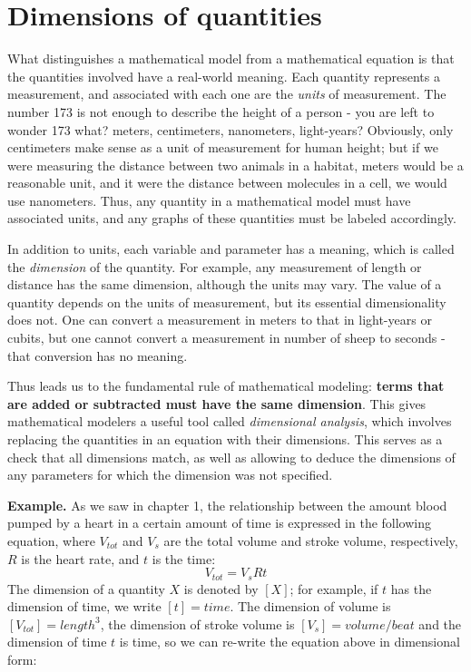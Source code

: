 \documentclass[
  letterpaper,
  DIV=11,
  numbers=noendperiod]{scrreprt}
\begin{document}
\hypertarget{sec:model2}{%
\section{Dimensions of quantities}\label{sec:model2}}

What distinguishes a mathematical model from a mathematical equation is
that the quantities involved have a real-world meaning. Each quantity
represents a measurement, and associated with each one are the
 \emph{units} of measurement. The number 173 is not enough
to describe the height of a person - you are left to wonder 173 what?
meters, centimeters, nanometers, light-years? Obviously, only
centimeters make sense as a unit of measurement for human height; but if
we were measuring the distance between two animals in a habitat, meters
would be a reasonable unit, and it were the distance between molecules
in a cell, we would use nanometers. Thus, any quantity in a mathematical
model must have associated units, and any graphs of these quantities
must be labeled accordingly.

In addition to units, each variable and parameter has a meaning, which
is called the  \emph{dimension} of the quantity. For
example, any measurement of length or distance has the same dimension,
although the units may vary. The value of a quantity depends on the
units of measurement, but its essential dimensionality does not. One can
convert a measurement in meters to that in light-years or cubits, but
one cannot convert a measurement in number of sheep to seconds - that
conversion has no meaning.

Thus leads us to the fundamental rule of mathematical modeling:
\textbf{terms that are added or subtracted must have the same
dimension}. This gives mathematical modelers a useful tool called
 \emph{dimensional analysis}, which involves
replacing the quantities in an equation with their dimensions. This
serves as a check that all dimensions match, as well as allowing to
deduce the dimensions of any parameters for which the dimension was not
specified. \cite{smith_mathematical_1968}

\textbf{Example.} As we saw in chapter 1, the relationship between the
amount blood pumped by a heart in a certain amount of time is expressed
in the following equation, where \(V_{tot}\) and \(V_s\) are the total
volume and stroke volume, respectively, \(R\) is the heart rate, and
\(t\) is the time: \[
V_{tot} = V_sRt
\] The dimension of a quantity \(X\) is denoted by \([X]\); for example,
if \(t\) has the dimension of time, we write \([t] = time\). The
dimension of volume is \([V_{tot}] = length^3\), the dimension of stroke
volume is \([V_s] = volume/beat\) and the dimension of time \(t\) is
time, so we can re-write the equation above in dimensional form:
\end{document}
